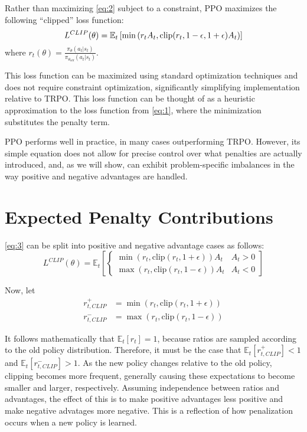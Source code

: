 \documentclass[letterpaper,twocolumn,10pt]{article}
\begin{document}
Rather than maximizing \eqref{eq:2} subject to a constraint, PPO maximizes the
following ``clipped'' loss function:
\scriptsize
\begin{equation}
    L^{CLIP}(\theta) = \\
    \mathbb{E}_t\left[ 
    \min\left(r_tA_t, \text{clip}
    (r_t, 1 - \epsilon, 1 + \epsilon)A_t\right)
    \right]
    \label{eq:3}
\end{equation}
\normalsize
where $r_t(\theta) = 
    \frac
    {\pi_{\theta}(a_t | s_t)}
    {\pi_{\theta_{old}} (a_t | s_t)}$.

This loss function can be maximized using standard optimization techniques and
does not require constraint optimization, significantly simplifying
implementation relative to TRPO. This loss function can be thought of as a
heuristic approximation to the loss function from \eqref{eq:1}, where the
minimization substitutes the penalty term.

PPO performs well in practice, in many cases outperforming TRPO. However, its
simple equation does not allow for precise control over what penalties are
actually introduced, and, as we will show, can exhibit problem-specific
imbalances in the way positive and negative advantages are handled. 

\section{Expected Penalty Contributions}

\eqref{eq:3} can be split into positive and negative advantage cases as follows:
\tiny
\begin{equation}
    L^{CLIP}(\theta) 
    = \mathbb{E}_t\left[ 
    \begin{cases}
        \min\left(r_t, \text{clip}
        (r_t, 1 + \epsilon)\right)A_t & A_t > 0\\
        \max\left(r_t, \text{clip}
        (r_t, 1 - \epsilon)\right)A_t & A_t < 0
    \end{cases}\right]
    \label{4}
\end{equation}
\normalsize

Now, let
\begin{align*}
    r_{t, CLIP}^+ &= 
    \min\left(r_t, \text{clip}
    (r_t, 1 + \epsilon)\right)\\
    r_{t, CLIP}^- &= 
    \max\left(r_t, \text{clip}
    (r_t, 1 - \epsilon)\right)
\end{align*}

It follows mathematically that $\mathbb{E}_t\left[ r_t \right] = 1$, because
ratios are sampled according to the old policy distribution. Therefore, it must
be the case that $\mathbb{E}_t\left[ r_{t, CLIP}^+ \right] < 1$ and 
$\mathbb{E}_t\left[ r_{t, CLIP}^- \right] > 1$. As the new policy changes
relative to the old policy, clipping becomes more frequent, generally causing
these expectations to become smaller and larger, respectively. Assuming
independence between ratios and advantages, the effect of this is to make
positive advantages less positive and make negative advatages more negative.
This is a reflection of how penalization occurs when a new policy is learned.
\end{document}
